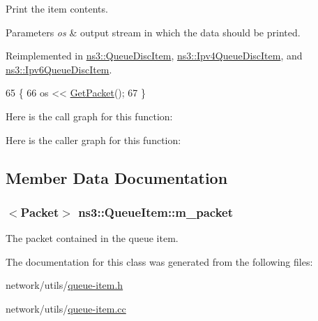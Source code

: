 Print the item contents. 


\begin{DoxyParams}{Parameters}
{\em os} & output stream in which the data should be printed. \\
\hline
\end{DoxyParams}


Reimplemented in \hyperlink{classns3_1_1QueueDiscItem_ade009bbe42f262c76d68a8530e207762}{ns3\+::\+Queue\+Disc\+Item}, \hyperlink{classns3_1_1Ipv4QueueDiscItem_a5d4a841fa193617619f509330299cf08}{ns3\+::\+Ipv4\+Queue\+Disc\+Item}, and \hyperlink{classns3_1_1Ipv6QueueDiscItem_a9b64e99e0437a559771d1e429621d7a0}{ns3\+::\+Ipv6\+Queue\+Disc\+Item}.


\begin{DoxyCode}
65 \{
66   os << \hyperlink{classns3_1_1QueueItem_aa8c2a59b1600fa2cee783867704f9cce}{GetPacket}();
67 \}
\end{DoxyCode}


Here is the call graph for this function\+:




Here is the caller graph for this function\+:




\subsection{Member Data Documentation}
\subsubsection[{\texorpdfstring{m\+\_\+packet}{m_packet}}]{$<${\bf Packet}$>$ ns3\+::\+Queue\+Item\+::m\+\_\+packet\hspace{0.3cm}{\ttfamily [private]}}\hypertarget{classns3_1_1QueueItem_aedb86761627cf4d885b3c0a9969099cf}{}\label{classns3_1_1QueueItem_aedb86761627cf4d885b3c0a9969099cf}
The packet contained in the queue item. 

The documentation for this class was generated from the following files\+:\begin{DoxyCompactItemize}
\item 
network/utils/\hyperlink{queue-item_8h}{queue-\/item.\+h}\item 
network/utils/\hyperlink{queue-item_8cc}{queue-\/item.\+cc}\end{DoxyCompactItemize}
